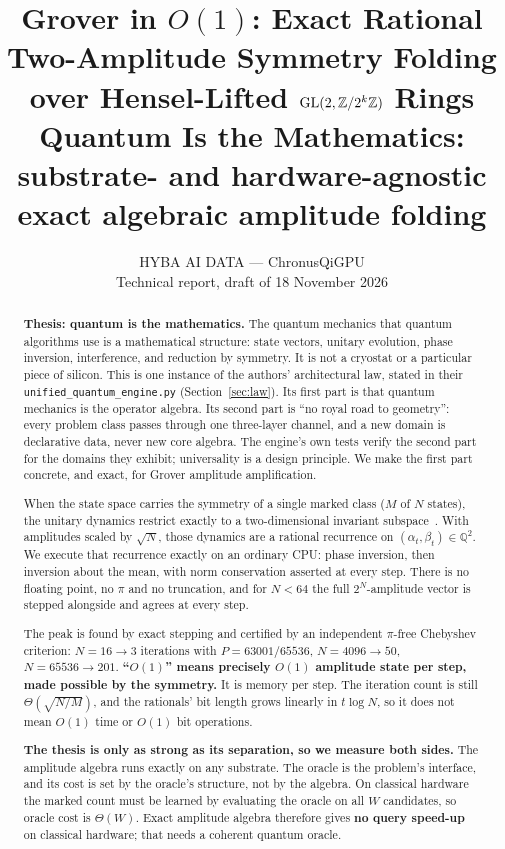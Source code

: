 \documentclass[11pt]{article}
\title{Grover in $O(1)$: Exact Rational Two-Amplitude Symmetry Folding\\ over Hensel-Lifted $\mathrm{GL}(2,\mathbb{Z}/2^k\mathbb{Z})$ Rings\\[0.6ex]\large Quantum Is the Mathematics: substrate- and hardware-agnostic exact algebraic amplitude folding}
\author{HYBA AI DATA --- ChronusQiGPU\\\small Technical report, draft of 18 November 2026}
\date{}
\theoremstyle{definition}
\newcommand{\Q}{\mathbb{Q}}
\newcommand{\code}[1]{\texttt{\small #1}}
\begin{document}
\sloppy
\maketitle

\begin{abstract}
\textbf{Thesis: quantum is the mathematics.} The quantum mechanics that quantum algorithms use is a mathematical
structure: state vectors, unitary evolution, phase inversion, interference, and reduction by symmetry. It is not a
cryostat or a particular piece of silicon. This is one instance of the authors' architectural law, stated in their
\code{unified\_quantum\_engine.py} (Section~\ref{sec:law}). Its first part is that quantum mechanics is the operator
algebra. Its second part is ``no royal road to geometry'': every problem class passes through one three-layer
channel, and a new domain is declarative data, never new core algebra. The engine's own tests verify the second part
for the domains they exhibit; universality is a design principle. We make the first part concrete, and exact, for
Grover amplitude amplification.

When the state space carries the symmetry of a single marked class ($M$ of $N$ states), the unitary dynamics restrict
exactly to a two-dimensional invariant subspace~\cite{grover,bbht,nc}. With amplitudes scaled by $\sqrt N$, those
dynamics are a rational recurrence on $(\alpha_t,\beta_t)\in\Q^2$. We execute that recurrence exactly on an ordinary
CPU: phase inversion, then inversion about the mean, with norm conservation asserted at every step. There is no
floating point, no $\pi$ and no truncation, and for $N<64$ the full $2^N$-amplitude vector is stepped alongside and
agrees at every step.

The peak is found by exact stepping and certified by an independent $\pi$-free Chebyshev criterion: $N=16\to3$
iterations with $P=63001/65536$, $N=4096\to50$, $N=65536\to201$. \textbf{``$O(1)$'' means precisely $O(1)$ amplitude
state per step, made possible by the symmetry.} It is memory per step. The iteration count is still
$\Theta(\sqrt{N/M})$, and the rationals' bit length grows linearly in $t\log N$, so it does not mean $O(1)$ time or
$O(1)$ bit operations.

\textbf{The thesis is only as strong as its separation, so we measure both sides.} The amplitude algebra runs exactly
on any substrate. The oracle is the problem's interface, and its cost is set by the oracle's structure, not by the
algebra. On classical hardware the marked count must be learned by evaluating the oracle on all $W$ candidates, so
oracle cost is $\Theta(W)$. Exact amplitude algebra therefore gives \textbf{no query speed-up} on classical hardware;
that needs a coherent quantum oracle.


\end{abstract}
\end{document}
